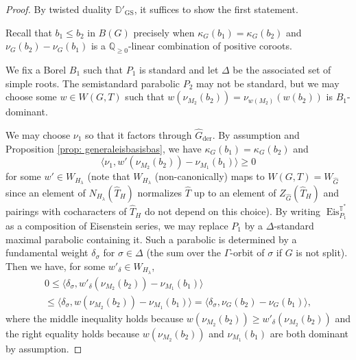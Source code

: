 \documentclass{amsart}
\theoremstyle{definition}
\theoremstyle{remark}
\numberwithin{equation}{section}
\newcommand{\der}{\mathrm{der}}
\newcommand{\Q}{\mathbb{Q}}
\newcommand{\wh}{\widehat}
\newcommand{\D}{\mathbb{D}}
\DeclareMathOperator{\Eis}{\mathrm{Eis}}
\newcommand{\GS}{\mathrm{GS}}
\newcommand{\T}{\mathbb{T}}
\begin{document}
\begin{proof}
By twisted duality $\D'_{\GS}$, it suffices to show the first statement. 

Recall that $b_1 \leq b_2$ in $B(G)$ precisely when $\kappa_G(b_1) = \kappa_G(b_2)$ and $\nu_G(b_2) - \nu_G(b_1)$ is a $\Q_{\geq 0}$-linear combination of positive coroots.

We fix a Borel $B_1$ such that ${P_1}$ is standard and let $\Delta$ be the associated set of simple roots. The semistandard parabolic $P_2$ may not be standard, but we may choose some $w \in W(G,T)$ such that $w(\nu_{M_2}(b_2))=\nu_{w(M_2)}(w(b_2))$ is $B_1$-dominant. 

We may choose $\nu_1$ so that it factors through $\wh G_\der$. By assumption and Proposition \ref{prop: generaleisbasisbas}, we have $\kappa_G(b_1) = \kappa_G(b_2)$ and 
\[
\langle \nu_1,  w'(\nu_{M_2}(b_2)) -\nu_{M_1}(b_1) \rangle \geq 0
\]
for some $w'\in W_{H_\lambda}$ (note that $W_{H_{\lambda}}$ (non-canonically) maps to $W(G,T) = W_{\wh{G}}$ since an element of $N_{H_{\lambda}}(\wh{T}_H)$ normalizes $\wh{T}$ up to an element of $Z_{\wh{G}}(\wh{T}_H)$ and pairings with cocharacters of $\wh{T}_H$ do not depend on this choice). 
By writing $\Eis^{\T^{\ast}}_{P_1}$ as a composition of Eisenstein series, we may replace $P_1$ by a $\Delta$-standard maximal parabolic containing it. Such a parabolic is determined by a fundamental weight
$\delta_{\sigma}$ for $\sigma \in \Delta$ (the sum over the $\Gamma$-orbit of $\sigma$ if $G$ is not split). Then we have, for some $w'_\delta\in W_{H_\lambda}$, 
\begin{multline*}
    0 \leq \langle  \delta_{\sigma} , w'_\delta(\nu_{M_2}(b_2)) -\nu_{M_1}(b_1)  \rangle \\ 
    \leq \langle  \delta_{\sigma} , w(\nu_{M_2}(b_2)) - \nu_{M_1}(b_1) \rangle = \langle \delta_{\sigma}, \nu_G(b_2) - \nu_G(b_1)  \rangle,
\end{multline*}
where the middle inequality holds because $w(\nu_{M_2}(b_2)) \geq  w'_{\delta}(\nu_{M_2}(b_2))$ and the right equality holds because $w(\nu_{M_2}(b_2))$ and $\nu_{M_1}(b_1)$ are both dominant by assumption.


\end{proof}
\end{document}
